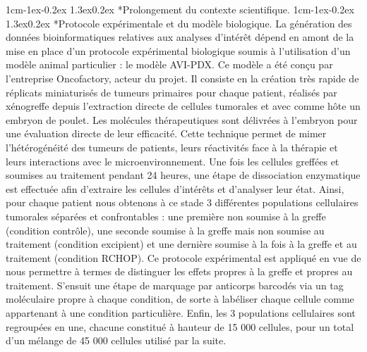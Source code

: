 \documentclass[12pt]{report}
\makeatletter
\renewcommand\subsubsection{\@startsection{subsubsection}{3}{\z@}%
	{1cm\@plus -1ex\@minus -0.2ex}%
	{1.3ex\@plus 0.2ex}%
	{\reset@font\normalsize\bf}}
\renewcommand\subparagraph{\@startsection{subparagraph}{5}{\z@}%
	{1cm\@plus -1ex\@minus -0.2ex}%
	{1.3ex\@plus 0.2ex}%
	{\reset@font\normalsize\it}}
\makeatother
\begin{document}
\subsubsection*{Prolongement du contexte scientifique.}
\subparagraph*{Protocole expérimentale et du modèle biologique.}
La génération des données bioinformatiques relatives aux analyses d'intérêt dépend en amont de la mise en place d'un protocole expérimental biologique soumis à l'utilisation d'un modèle animal particulier : 
le modèle AVI-PDX. Ce modèle a été conçu par l'entreprise Oncofactory\cite{delloyebourgeois}, acteur du projet. 
Il consiste en la création très rapide de réplicats miniaturisés de tumeurs primaires pour chaque patient, réalisés par xénogreffe depuis l'extraction directe de cellules tumorales et avec comme hôte un embryon de poulet.
Les molécules thérapeutiques sont délivrées à l'embryon pour une évaluation directe de leur efficacité. Cette technique permet de mimer l'hétérogénéité des tumeurs de patients, leurs réactivités face à la thérapie et leurs interactions avec le microenvironnement.
Une fois les cellules greffées et soumises au traitement pendant 24 heures, une étape de dissociation enzymatique est effectuée afin d'extraire les cellules d'intérêts et d'analyser leur état.
Ainsi, pour chaque patient nous obtenons à ce stade 3 différentes populations cellulaires tumorales séparées et confrontables : 
une première non soumise à la greffe (condition contrôle), une seconde soumise à la greffe mais non soumise au traitement (condition excipient) et une dernière soumise à la fois à la greffe et au traitement (condition RCHOP).
Ce protocole expérimental est appliqué en vue de nous permettre à termes de distinguer les effets propres à la greffe et propres au traitement.
S'ensuit une étape de marquage par anticorps barcodés via un tag moléculaire propre à chaque condition, de sorte à labéliser chaque cellule comme appartenant à une condition particulière.
Enfin, les 3 populations cellulaires sont regroupées en une, chacune constitué à hauteur de 15 000 cellules, pour un total d'un mélange de 45 000 cellules utilisé par la suite.
\end{document}
